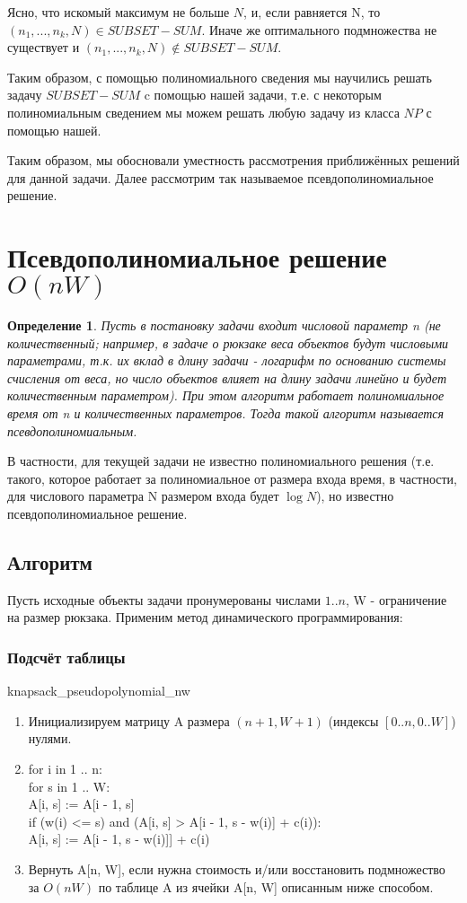 \documentclass{article}
\newtheorem{definition}{Определение} %
\begin{document}
Ясно, что искомый максимум не больше $N$, и, если равняется N, то $(n_1 , . . . , n_k , N ) \in SUBSET-SUM$. Иначе же оптимального подмножества не существует и $(n_1 , . . . , n_k , N ) \not\in SUBSET-SUM$.

Таким образом, с помощью полиномиального сведения мы научились решать задачу $SUBSET-SUM$ c помощью нашей задачи, т.е. с некоторым полиномиальным сведением мы можем решать любую задачу из класса $NP$ с помощью нашей.

Таким образом, мы обосновали уместность рассмотрения приближённых решений для данной задачи. Далее рассмотрим так называемое псевдополиномиальное решение. 


\section{Псевдополиномиальное решение $O(nW)$}

	\begin{definition}
		Пусть в постановку задачи входит числовой параметр n (не количественный; например, в задаче о рюкзаке веса объектов будут числовыми параметрами, т.к. их вклад в длину задачи - логарифм по основанию системы счисления от веса, но число объектов влияет на длину задачи линейно и будет количественным параметром). При этом алгоритм работает полиномиальное время от n и количественных параметров. Тогда такой алгоритм называется псевдополиномиальным.
	\end{definition}
	В частности, для текущей задачи не известно полиномиального решения (т.е. такого, которое работает за полиномиальное от размера входа время, в частности, для числового параметра N размером входа будет $\log{N}$), но известно псевдополиномиальное решение.
	
	\subsection{Алгоритм}
	
		
	Пусть исходные объекты задачи пронумерованы числами $1..n$, W - ограничение на размер рюкзака. Применим метод динамического программирования:
	
	
	\subsubsection{Подсчёт таблицы}
	
	knapsack\_pseudopolynomial\_nw
\begin{enumerate}
	\item Инициализируем матрицу A размера $(n + 1, W + 1)$ (индексы $[0..n, 0..W]$) нулями.
	\item for i in 1 .. n: \\
		for s in 1 .. W: \\
		A[i, s] := A[i - 1, s] \\
		if (w(i) <= s) and (A[i, s] > A[i - 1, s - w(i)] + c(i)): \\
			A[i, s] := A[i - 1, s - w(i)]] + c(i)
	\item Вернуть A[n, W], если нужна стоимость и/или восстановить подмножество за $O(nW)$ по таблице A из ячейки A[n, W] описанным ниже способом.
	

\end{enumerate}
\end{document}
